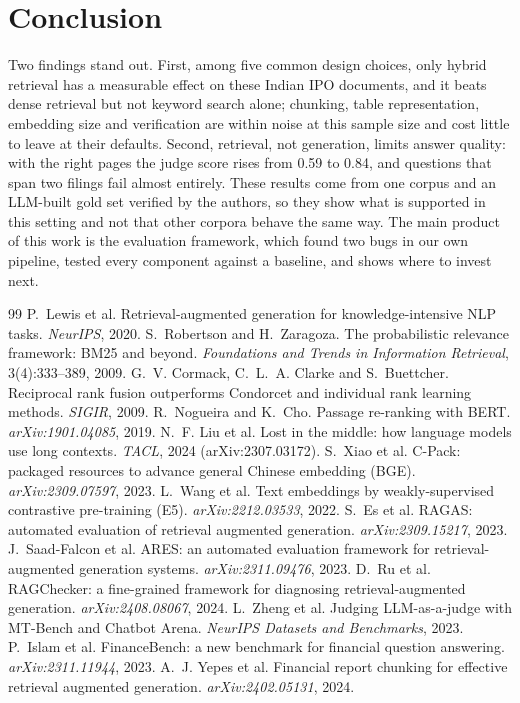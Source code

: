 \documentclass[11pt,a4paper]{article}
\begin{document}
\section{Conclusion}
Two findings stand out. First, among five common design choices, only hybrid retrieval has a measurable effect on these Indian IPO documents, and it beats dense retrieval but not keyword search alone; chunking, table representation, embedding size and verification are within noise at this sample size and cost little to leave at their defaults. Second, retrieval, not generation, limits answer quality: with the right pages the judge score rises from 0.59 to 0.84, and questions that span two filings fail almost entirely. These results come from one corpus and an LLM-built gold set verified by the authors, so they show what is supported in this setting and not that other corpora behave the same way. The main product of this work is the evaluation framework, which found two bugs in our own pipeline, tested every component against a baseline, and shows where to invest next.

\begin{thebibliography}{99}
\small
{} P.~Lewis et al. Retrieval-augmented generation for knowledge-intensive NLP tasks. \emph{NeurIPS}, 2020.
 S.~Robertson and H.~Zaragoza. The probabilistic relevance framework: BM25 and beyond. \emph{Foundations and Trends in Information Retrieval}, 3(4):333--389, 2009.
 G.~V. Cormack, C.~L.~A. Clarke and S.~Buettcher. Reciprocal rank fusion outperforms Condorcet and individual rank learning methods. \emph{SIGIR}, 2009.
 R.~Nogueira and K.~Cho. Passage re-ranking with BERT. \emph{arXiv:1901.04085}, 2019.
 N.~F. Liu et al. Lost in the middle: how language models use long contexts. \emph{TACL}, 2024 (arXiv:2307.03172).
 S.~Xiao et al. C-Pack: packaged resources to advance general Chinese embedding (BGE). \emph{arXiv:2309.07597}, 2023.
 L.~Wang et al. Text embeddings by weakly-supervised contrastive pre-training (E5). \emph{arXiv:2212.03533}, 2022.
 S.~Es et al. RAGAS: automated evaluation of retrieval augmented generation. \emph{arXiv:2309.15217}, 2023.
 J.~Saad-Falcon et al. ARES: an automated evaluation framework for retrieval-augmented generation systems. \emph{arXiv:2311.09476}, 2023.
 D.~Ru et al. RAGChecker: a fine-grained framework for diagnosing retrieval-augmented generation. \emph{arXiv:2408.08067}, 2024.
 L.~Zheng et al. Judging LLM-as-a-judge with MT-Bench and Chatbot Arena. \emph{NeurIPS Datasets and Benchmarks}, 2023.
 P.~Islam et al. FinanceBench: a new benchmark for financial question answering. \emph{arXiv:2311.11944}, 2023.
 A.~J. Yepes et al. Financial report chunking for effective retrieval augmented generation. \emph{arXiv:2402.05131}, 2024.
\end{thebibliography}
\end{document}
